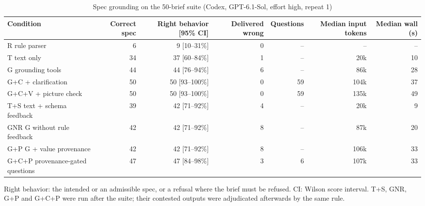 \begin{table}[t]
\centering\small
\caption{Spec grounding on the 50-brief suite (Codex, GPT-6.1-Sol, effort high, repeat 1)}
\label{tab:t4_x2_conditions}
\begin{tabular}{lrrrrrr}
\toprule
Condition & Correct spec & Right behavior [95\% CI] & Delivered wrong & Questions & Median input tokens & Median wall (s) \\
\midrule
R rule parser & 6 & 9 [10--31\%] & 0 & -- & -- & -- \\
T text only & 34 & 37 [60--84\%] & 1 & -- & 20k & 10 \\
G grounding tools & 44 & 44 [76--94\%] & 6 & -- & 86k & 28 \\
G+C + clarification & 50 & 50 [93--100\%] & 0 & 59 & 104k & 37 \\
G+C+V + picture check & 50 & 50 [93--100\%] & 0 & 59 & 135k & 49 \\
T+S text + schema feedback & 39 & 42 [71--92\%] & 4 & -- & 20k & 9 \\
GNR G without rule feedback & 42 & 42 [71--92\%] & 8 & -- & 87k & 20 \\
G+P G + value provenance & 42 & 42 [71--92\%] & 8 & -- & 106k & 33 \\
G+C+P provenance-gated questions & 47 & 47 [84--98\%] & 3 & 6 & 107k & 33 \\
\bottomrule
\end{tabular}
\par\smallskip\footnotesize Right behavior: the intended or an admissible spec, or a refusal where the brief must be refused. CI: Wilson score interval. T+S, GNR, G+P and G+C+P were run after the suite; their contested outputs were adjudicated afterwards by the same rule.
\end{table}
